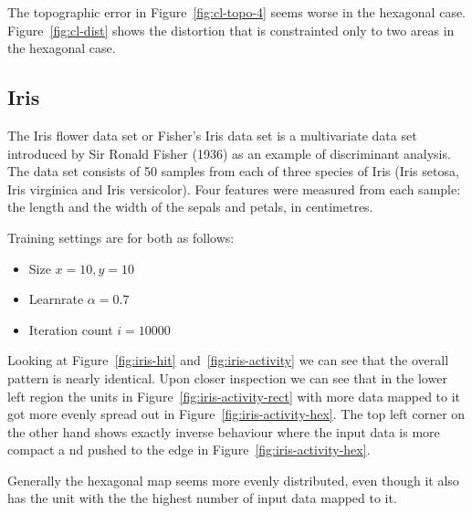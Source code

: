 \documentclass{acm_proc_article-sp}
\begin{document}

The topographic error in Figure~\ref{fig:cl-topo-4} seems worse in the hexagonal case. Figure~\ref{fig:cl-dist} shows the distortion that is constrainted only to two areas in the hexagonal case.

\subsection{Iris}
\label{sec:iris}

The Iris flower data set or Fisher's Iris data set is a multivariate data set introduced by Sir Ronald Fisher (1936) as an example of discriminant analysis.
The data set consists of 50 samples from each of three species of Iris (Iris setosa, Iris virginica and Iris versicolor). Four features were measured from each sample: the length and the width of the sepals and petals, in centimetres.

Training settings are for both as follows:
\begin{itemize}
  \item Size $x = 10, y = 10$
  \item Learnrate $\alpha = 0.7$
  \item Iteration count $i = 10000$
\end{itemize}


Looking at Figure~\ref{fig:iris-hit} and~\ref{fig:iris-activity} we can see that the overall pattern is nearly identical.
Upon closer inspection we can see that in the lower left region the units in Figure~\ref{fig:iris-activity-rect} with more data mapped to it
got more evenly spread out in Figure~\ref{fig:iris-activity-hex}. The top left corner on the other hand shows exactly inverse behaviour where the input data
is more compact a nd pushed to the edge in Figure~\ref{fig:iris-activity-hex}.

Generally the hexagonal map seems more evenly distributed, even though it also has the unit with the the highest number of input data mapped to it.

\end{document}
